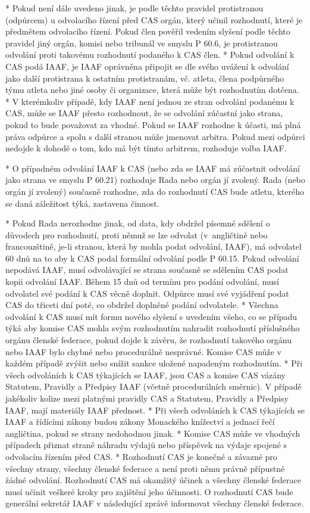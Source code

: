 * Pokud není dále uvedeno jinak, je podle těchto pravidel protistranou (odpůrcem) u odvolacího řízení před CAS orgán, který učinil rozhodnutí, které je předmětem odvolacího řízení. Pokud člen pověřil vedením slyšení podle těchto pravidel jiný orgán, komisi nebo tribunál ve smyslu P 60.6,  je protistranou odvolání proti takovému rozhodnutí podaného k CAS člen.
* Pokud odvolání k CAS podá IAAF, je IAAF oprávněna připojit se dle svého uvážení k odvolání jako další protistrana k ostatním protistranám, vč. atleta, člena podpůrného týmu atleta nebo jiné osoby či organizace, která může být rozhodnutím dotčena.
* V kterémkoliv případě, kdy IAAF není jednou ze stran odvolání podanému k CAS, může se IAAF přesto rozhodnout, že se odvolání zúčastní jako strana, pokud to bude považovat za vhodné. Pokud se IAAF rozhodne k účasti, má plná práva odpůrce a spolu s další stranou může jmenovat arbitra. Pokud mezi odpůrci nedojde k dohodě o tom, kdo má být tímto arbitrem, rozhoduje volba IAAF.

* O případném odvolání IAAF k CAS (nebo zda se IAAF má zúčastnit odvolání jako strana ve smyslu P 60.21)  rozhoduje Rada nebo orgán jí zvolený. Rada (nebo orgán jí zvolený) současně rozhodne, zda do rozhodnutí CAS bude atletu, kterého se daná záležitost týká, zastavena činnost.

* Pokud Rada nerozhodne jinak, od data, kdy obdržel písemné sdělení o důvodech pro rozhodnutí,  proti němuž se lze odvolat (v~angličtině nebo francouzštině, je-li stranou, která by mohla podat odvolání, IAAF), má odvolatel 60 dnů na to aby k CAS podal  formální odvolání podle P 60.15. Pokud odvolání nepodává IAAF, musí odvolávající se strana současně se sdělením CAS podat kopii odvolání IAAF. Během 15 dnů od termínu pro podání odvolání, musí odvolatel své podání k CAS věcně doplnit. Odpůrce musí své vyjádření podat CAS do třiceti dní poté, co obdržel doplněné podání odvolatele.
* Všechna odvolání k CAS musí mít formu nového slyšení s uvedením všeho, co se případu týká aby komise CAS mohla svým rozhodnutím nahradit rozhodnutí příslušného orgánu členské federace, pokud dojde k závěru, že rozhodnutí takového orgánu nebo IAAF bylo chybné nebo procedurálně nesprávné. Komise CAS může v každém případě zvýšit nebo snížit sankce uložené napadeným rozhodnutím.
* Při všech odvoláních k CAS týkajících se IAAF, jsou CAS a komise CAS vázány Statutem, Pravidly a Předpisy IAAF (včetně procedurálních směrnic). V případě jakékoliv kolize mezi platnými pravidly CAS a Statutem, Pravidly a Předpisy IAAF, mají materiály IAAF přednost.
* Při všech odvoláních k CAS týkajících se IAAF a řídícími zákony budou zákony Monackého knížectví a jednací řečí angličtina, pokud se strany nedohodnou jinak.
* Komise CAS může ve vhodných případech přiznat straně náhradu výdajů nebo příspěvek na výdaje spojené s odvolacím řízením před CAS.
* Rozhodnutí CAS je konečné a závazné pro všechny strany, všechny členské federace a není proti němu právně přípustné žádné odvolání. Rozhodnutí CAS má okamžitý účinek a všechny členské federace musí učinit veškeré kroky pro zajištění jeho účinnosti. O rozhodnutí CAS bude generální sekretář IAAF v následující zprávě informovat všechny členské federace.
\enditems

\endinput
